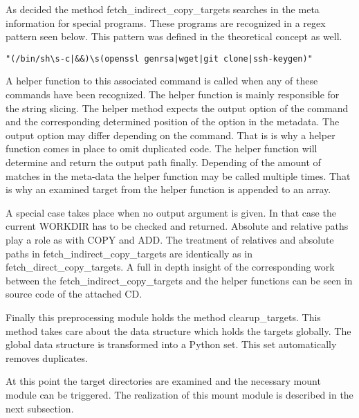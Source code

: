 As decided the method fetch\_indirect\_copy\_targets searches in the meta information for special programs. 
These programs are recognized in a regex pattern seen below. 
This pattern was defined in the theoretical concept as well.
\begin{lstlisting}
"(/bin/sh\s-c|&&)\s(openssl genrsa|wget|git clone|ssh-keygen)"
\end{lstlisting}
A helper function to this associated command is called when any of these commands have been recognized. 
The helper function is mainly responsible for the string slicing.
The helper method expects the output option of the command and the corresponding determined position of the option in the metadata.
The output option may differ depending on the command. 
That is is why a helper function comes in place to omit duplicated code. 
The helper function will determine and return the output path finally.
Depending of the amount of matches in the meta-data the helper function may be called multiple times. 
That is why an examined target from the helper function is appended to an array. 

A special case takes place when no output argument is given. 
In that case the current WORKDIR has to be checked and returned.
Absolute and relative paths play a role as with COPY and ADD. 
The treatment of relatives and absolute paths in fetch\_indirect\_copy\_targets are identically as in fetch\_direct\_copy\_targets.
A full in depth insight of the corresponding work between the fetch\_indirect\_copy\_targets and the helper functions can be seen in source code of the attached CD.

Finally this preprocessing module holds the method clearup\_targets. This method takes care about the data structure which holds the targets globally. The global data structure is transformed into a Python set. This set automatically removes duplicates.
	
At this point the target directories are examined and the necessary mount module can be triggered. The realization of this mount module is described in the next subsection.

